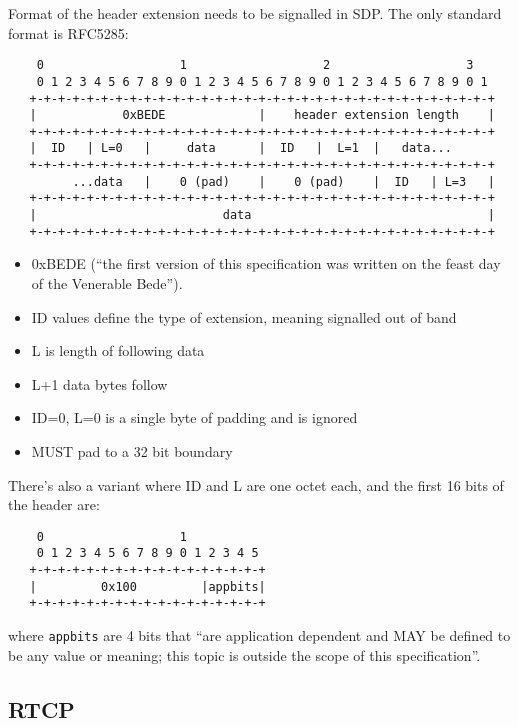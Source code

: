 \documentclass[10pt]{article}
\begin{document}
Format of the header extension needs to be signalled in SDP. The only
standard format is RFC5285:

\footnotesize
\begin{verbatim}
    0                   1                   2                   3
    0 1 2 3 4 5 6 7 8 9 0 1 2 3 4 5 6 7 8 9 0 1 2 3 4 5 6 7 8 9 0 1
   +-+-+-+-+-+-+-+-+-+-+-+-+-+-+-+-+-+-+-+-+-+-+-+-+-+-+-+-+-+-+-+-+
   |            0xBEDE             |    header extension length    |
   +-+-+-+-+-+-+-+-+-+-+-+-+-+-+-+-+-+-+-+-+-+-+-+-+-+-+-+-+-+-+-+-+
   |  ID   | L=0   |     data      |  ID   |  L=1  |   data...
   +-+-+-+-+-+-+-+-+-+-+-+-+-+-+-+-+-+-+-+-+-+-+-+-+-+-+-+-+-+-+-+-+
         ...data   |    0 (pad)    |    0 (pad)    |  ID   | L=3   |
   +-+-+-+-+-+-+-+-+-+-+-+-+-+-+-+-+-+-+-+-+-+-+-+-+-+-+-+-+-+-+-+-+
   |                          data                                 |
   +-+-+-+-+-+-+-+-+-+-+-+-+-+-+-+-+-+-+-+-+-+-+-+-+-+-+-+-+-+-+-+-+
\end{verbatim}
\normalsize

\begin{itemize}
  \item 0xBEDE (``the first version of this specification was written on
    the feast day of the Venerable Bede'').
  \item ID values define the type of extension, meaning signalled out of 
    band
  \item L is length of following data
  \item L+1 data bytes follow
  \item ID=0, L=0 is a single byte of padding and is ignored
  \item MUST pad to a 32 bit boundary
\end{itemize}

There's also a variant where ID and L are one octet each, and the first 16
bits of the header are:
\footnotesize
\begin{verbatim}
    0                   1
    0 1 2 3 4 5 6 7 8 9 0 1 2 3 4 5
   +-+-+-+-+-+-+-+-+-+-+-+-+-+-+-+-+
   |         0x100         |appbits|
   +-+-+-+-+-+-+-+-+-+-+-+-+-+-+-+-+
\end{verbatim}
\normalsize
where \verb|appbits| are 4 bits that ``are application dependent and MAY be
defined to be any value or meaning; this topic is outside the scope of this
specification''.

\subsection{RTCP}
\end{document}
